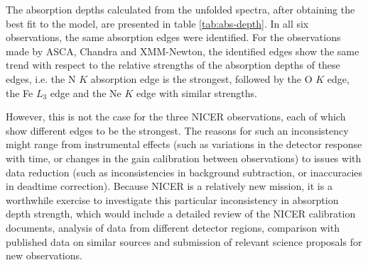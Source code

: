     The absorption depths calculated from the unfolded spectra, after obtaining the best fit to the model, are presented in table \ref{tab:abs-depth}. In all six observations, the same absorption edges were identified. For the observations made by ASCA, Chandra and XMM-Newton, the identified edges show the same trend with respect to the relative strengths of the absorption depths of these edges, i.e. the N $K$ absorption edge is the strongest, followed by the O $K$ edge, the Fe $L_3$ edge and the Ne $K$ edge with similar strengths.
    
    However, this is not the case for the three NICER observations, each of which show different edges to be the strongest. The reasons for such an inconsistency might range from instrumental effects (such as variations in the detector response with time, or changes in the gain calibration between observations) to issues with data reduction (such as inconsistencies in background subtraction, or inaccuracies in deadtime correction). Because NICER is a relatively new mission, it is a worthwhile exercise to investigate this particular inconsistency in absorption depth strength, which would include a detailed review of the NICER calibration documents, analysis of data from different detector regions, comparison with published data on similar sources and submission of relevant science proposals for new observations.